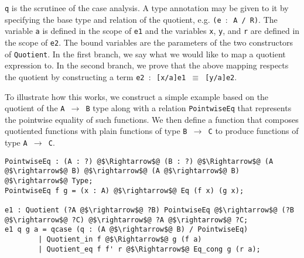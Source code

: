 \documentclass[12pt,twoside,maitrise]{dms}
\theoremstyle{definition}
\numberwithin{equation}{section}
\numberwithin{table}{chapter}
\numberwithin{figure}{chapter}
\newcommand\id[1] {\texttt{#1}}
\newcommand\fn[1] {\texttt{#1}}
\begin{document}
\id{q} is the scrutinee of the case analysis. A type annotation may be given to it
by specifying the base type and relation of the quotient, e.g. \fn{(e $\colon$ A / R)}.
The variable \id{a} is defined in the scope of \id{e1} and the variables \id{x},
\id{y}, and \id{r} are defined in the scope of \id{e2}. The bound variables are
the parameters of the two constructors of \id{Quotient}. In the first branch, we
say what we would like to map a quotient expression to. In the second branch, we
prove that the above mapping respects the quotient by constructing a term
\fn{e2 $\colon$ [x/a]e1 $\equiv$ [y/a]e2}.

To illustrate how this works, we construct a simple example based on the
quotient of the \id{A $\rightarrow$ B} type along with a relation
\id{PointwiseEq} that represents the pointwise equality of such functions. We
then define a function that composes quotiented functions with plain functions
of type \id{B $\rightarrow$ C} to produce functions of type \id{A $\rightarrow$
  C}.



\begin{verbatim}
PointwiseEq : (A : ?) @$\Rightarrow$@ (B : ?) @$\Rightarrow$@ (A @$\rightarrow$@ B) @$\rightarrow$@ (A @$\rightarrow$@ B) @$\rightarrow$@ Type;
PointwiseEq f g = (x : A) @$\rightarrow$@ Eq (f x) (g x);

e1 : Quotient (?A @$\rightarrow$@ ?B) PointwiseEq @$\rightarrow$@ (?B @$\rightarrow$@ ?C) @$\rightarrow$@ ?A @$\rightarrow$@ ?C;
e1 q g a = qcase (q : (A @$\rightarrow$@ B) / PointwiseEq)
        | Quotient_in f @$\Rightarrow$@ g (f a)
        | Quotient_eq f f' r @$\Rightarrow$@ Eq_cong g (r a);
\end{verbatim}
\end{document}
